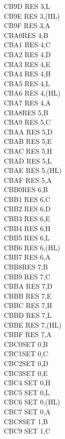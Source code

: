 \documentclass[twoside,openright,a4paper]{book}
\begin{document}
\begin{multicols}{3}
{\begin{tabbing}
	CB9D\> 	RES 3,L\\
	CB9E\> 	RES 3,(HL)\\
	CB9F\> 	RES 3,A\\
	CBA0\>RES 4,B\\
	CBA1\> 	RES 4,C\\
	CBA2\> 	RES 4,D\\
	CBA3\> 	RES 4,E\\
	CBA4\> 	RES 4,H\\
	CBA5\> 	RES 4,L\\
	CBA6\> 	RES 4,(HL)\\
	CBA7\> 	RES 4,A\\
	CBA8\>RES 5,B\\
	CBA9\> 	RES 5,C\\
	CBAA\> 	RES 5,D\\
	CBAB\> 	RES 5,E\\
	CBAC\> 	RES 5,H\\
	CBAD\> 	RES 5,L\\
	CBAE\> 	RES 5,(HL)\\
	CBAF\> 	RES 5,A\\
	CBB0\>RES 6,B\\
	CBB1\> 	RES 6,C\\
	CBB2\> 	RES 6,D\\
	CBB3\> 	RES 6,E\\
	CBB4\> 	RES 6,H\\
	CBB5\> 	RES 6,L\\
	CBB6\> 	RES 6,(HL)\\
	CBB7\> 	RES 6,A\\
	CBB8\>RES 7,B\\
	CBB9\> 	RES 7,C\\
	CBBA\> 	RES 7,D\\
	CBBB\> 	RES 7,E\\
	CBBC\> 	RES 7,H\\
	CBBD\> 	RES 7,L\\
	CBBE\> 	RES 7,(HL)\\
	CBBF\> 	RES 7,A\\
	CBC0\>SET 0,B\\
	CBC1\>SET 0,C\\
	CBC2\>SET 0,D\\
	CBC3\>SET 0,E\\
	CBC4\> 	SET 0,H\\
	CBC5\> 	SET 0,L\\
	CBC6\> 	SET 0,(HL)\\
	CBC7\> 	SET 0,A\\
	CBC8\>SET 1,B\\
	CBC9\> 	SET 1,C\\

\end{tabbing}}
\end{multicols}
\end{document}

